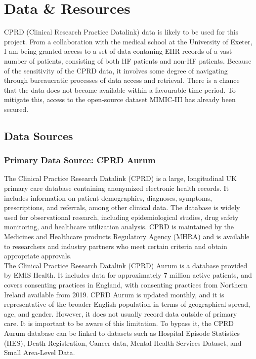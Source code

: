 \documentclass[%
 reprint,
 amsmath,amssymb,
 aps,
 nofootinbib,
]{revtex4-2}
\theoremstyle{definition}
\begin{document}
\section{\label{datares}Data \& Resources}
CPRD (Clinical Research Practice Datalink) data is likely to be used for this project. From a collaboration with the medical school at the University of Exeter, I am being granted access to a set of data contaning EHR records of a vast number of patients, consisting of both HF patients and non-HF patients. Because of the sensitivity of the CPRD data, it involves some degree of navigating through bureaucratic processes of data access and retrieval. There is a chance that the data does not become available within a favourable time period. To mitigate this, access to the open-source dataset MIMIC-III has already been secured.

\subsection{\label{data}Data Sources}

\subsubsection{\label{cprd} Primary Data Source: CPRD Aurum}
The Clinical Practice Research Datalink (CPRD) is a large, longitudinal UK primary care database containing anonymized electronic health records. It includes information on patient demographics, diagnoses, symptoms, prescriptions, and referrals, among other clinical data. The database is widely used for observational research, including epidemiological studies, drug safety monitoring, and healthcare utilization analysis. CPRD is maintained by the Medicines and Healthcare products Regulatory Agency (MHRA) and is available to researchers and industry partners who meet certain criteria and obtain appropriate approvals.\\

The Clinical Practice Research Datalink (CPRD) Aurum is a database provided by EMIS Health. It includes data for approximately 7 million active patients, and covers consenting practices in England, with consenting practices from Northern Ireland available from 2019. CPRD Aurum is updated monthly, and it is representative of the broader English population in terms of geographical spread, age, and gender. However, it does not usually record data outside of primary care. It is important to be aware of this limitation. To bypass it, the CPRD Aurum database can be linked to datasets such as Hospital Episode Statistics (HES), Death Registration, Cancer data, Mental Health Services Dataset, and Small Area-Level Data.
\end{document}
